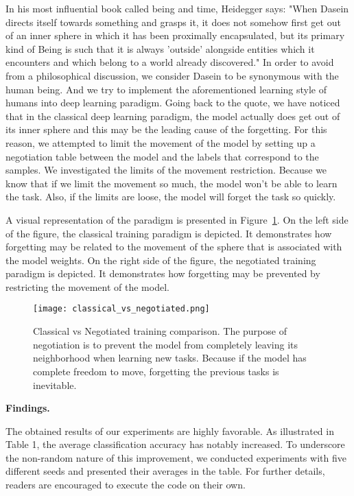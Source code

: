 \documentclass{article}
\begin{document}
In his most influential book called being and time, Heidegger says: "When Dasein directs itself towards something and grasps it, it does not somehow first get out of an inner sphere in which it has been proximally encapsulated, but its primary kind of Being is such that it is always 'outside' alongside entities which it encounters and which belong to a world already discovered." In order to avoid from a philosophical discussion, we consider Dasein to be synonymous with the human being. And we try to implement the aforementioned learning style of humans into deep learning paradigm. 
Going back to the quote, we have noticed that in the classical deep learning paradigm, the model actually does get out of its inner sphere and this may be the leading cause of the forgetting. For this reason, we attempted to limit the movement of the model by setting up a negotiation table between the model and the labels that correspond to the samples. We investigated the limits of the movement restriction. Because we know that if we limit the movement so much, the model won’t be able to learn the task. Also, if the limits are loose, the model will forget the task so quickly. 

A visual representation of the paradigm is presented in Figure~\ref{fig:classical_vs_negotiated}. On the left side of the figure, the classical training paradigm is depicted. It demonstrates how forgetting may be related to the movement of the sphere that is associated with the model weights. 
On the right side of the figure, the negotiated training paradigm is depicted. It demonstrates how forgetting may be prevented by restricting the movement of the model.


\begin{figure}[ht]
\centering
\texttt{[image: classical\_vs\_negotiated.png]}
\caption{Classical vs Negotiated training comparison. The purpose of negotiation is to prevent the model from completely leaving its neighborhood when learning new tasks. Because if the model has complete freedom to move, forgetting the previous tasks is inevitable. }
\label{fig:classical_vs_negotiated}
\end{figure}




\textbf{Findings.}

The obtained results of our experiments are highly favorable. As illustrated in Table 1, the average classification accuracy has notably increased. To underscore the non-random nature of this improvement, we conducted experiments with five different seeds and presented their averages in the table. For further details, readers are encouraged to execute the code on their own.
\end{document}
